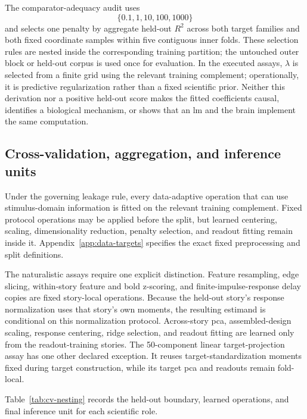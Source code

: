 The comparator-adequacy audit uses
\[
\{0.1,1,10,100,1000\} %
\]
and selects one penalty by aggregate held-out \(R^2\) across both target families and both fixed coordinate samples within five contiguous inner folds.
These selection rules are nested inside the corresponding training partition; the untouched outer block or held-out corpus is used once for evaluation.
In the executed assays, \(\lambda\) is selected from a finite grid using the relevant training complement; operationally, it is predictive regularization rather than a fixed scientific prior.
Neither this derivation nor a positive held-out score makes the fitted coefficients causal, identifies a biological mechanism, or shows that an \ac{lm} and the brain implement the same computation.

\subsection{Cross-validation, aggregation, and inference units}

Under the governing leakage rule, every data-adaptive operation that can use stimulus-domain information is fitted on the relevant training complement.
Fixed protocol operations may be applied before the split, but learned centering, scaling, dimensionality reduction, penalty selection, and readout fitting remain inside it.
Appendix~\ref{app:data-targets} specifies the exact fixed preprocessing and split definitions.

The naturalistic assays require one explicit distinction.
Feature resampling, edge slicing, within-story feature and \ac{bold} z-scoring, and finite-impulse-response delay copies are fixed story-local operations.
Because the held-out story's response normalization uses that story's own moments, the resulting estimand is conditional on this normalization protocol.
Across-story \ac{pca}, assembled-design scaling, response centering, ridge selection, and readout fitting are learned only from the readout-training stories.
The 50-component linear target-projection assay has one other declared exception.
It reuses target-standardization moments fixed during target construction, while its target \ac{pca} and readouts remain fold-local. 

 Table~\ref{tab:cv-nesting} records the held-out boundary, learned operations, and final inference unit for each scientific role.

